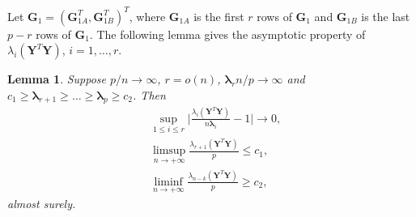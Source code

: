 \documentclass[12pt]{article} %
\newcommand{\bY}{\mathbf{Y}}
\newcommand{\bG}{\mathbf{G}}
\newcommand{\bfsym}[1]{\ensuremath{\boldsymbol{#1}}}
\def\blambda {\bfsym {\lambda}}
\newtheorem{lemma}{Lemma}
\theoremstyle{definition}
\begin{document}
Let $\bG_1=(\bG_{1A}^T,\bG_{1B}^T)^T$, where $\bG_{1A}$ is the first $r$ rows of $\bG_1$ and $\bG_{1B}$ is the last $p-r$ rows of $\bG_1$.
The following lemma gives the asymptotic property of $\lambda_{i}(\bY^T \bY)$, $i=1,\ldots, r$.
\begin{lemma}\label{PCAlemma1}
    Suppose $p/n\to \infty$, $r=o(n)$, $\blambda_r n/p\to \infty$ and $c_1\geq\blambda_{r+1}\geq \ldots \geq \blambda_p\geq c_2$. 
    Then
    \begin{align}
        &\sup_{1\leq i\leq r}\Big|\frac{\lambda_{i}(\bY^T \bY)}{n\blambda_i}-1\Big|\to 0,\label{PCAlemma1:eq1}\\
        &\limsup_{n\to +\infty}\frac{\lambda_{r+1}(\bY^T\bY)}{p}\leq c_1,\label{PCAlemma1:eq2}\\
        &\liminf_{n\to +\infty}\frac{\lambda_{n-k}(\bY^T\bY)}{p}\geq c_2,\label{PCAlemma1:eq3}
    \quad
    \end{align}
    almost surely.
\end{lemma}
\end{document}
